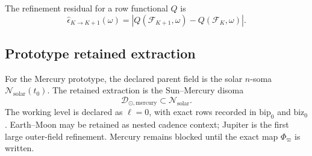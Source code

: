 The refinement residual for a row functional \(Q\) is
\[
\widehat\epsilon_{K\to K+1}(\omega)
=
\left|
Q(\mathcal F_{K+1},\omega)-Q(\mathcal F_K,\omega)
\right|.
\]

\subsection{Prototype retained extraction}
\label{man:workflow-mercury-prototype}

For the Mercury prototype, the declared parent field is the solar \(n\)-soma \(\mathcal N_{\mathrm{solar}}(t_0)\). The retained extraction is the Sun--Mercury disoma
\[
\mathcal D_{\odot,\mathrm{mercury}}\subset\mathcal N_{\mathrm{solar}}.
\]
The working level is declared as \(\ell=0\), with exact rows recorded in \(\mathrm{bip}_0\) and \(\mathrm{biz}_0\). Earth--Moon may be retained as nested cadence context; Jupiter is the first large outer-field refinement. Mercury remains blocked until the exact map \(\Phi_{\varpi}\) is written.

